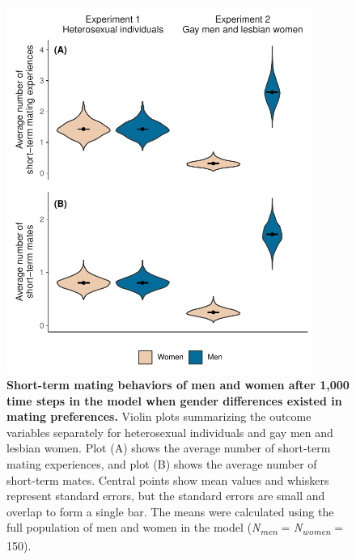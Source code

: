 \documentclass[
  12pt,
]{article}
\begin{document}
\begin{figure}[h]
  \centering
  \includegraphics[width=100mm]{figures/fig1_men_vs_women.pdf}
  \caption{\textbf{Short-term mating behaviors of men and women after 1,000 time steps in the model when gender differences existed in mating preferences.} Violin plots summarizing the outcome variables separately for heterosexual individuals and gay men and lesbian women. Plot (A) shows the average number of short-term mating experiences, and plot (B) shows the average number of short-term mates. Central points show mean values and whiskers represent standard errors, but the standard errors are small and overlap to form a single bar. The means were calculated using the full population of men and women in the model (\textit{N\textsubscript{men}} = \textit{N\textsubscript{women}} = 150).}
  \label{fig:men_vs_women}
\end{figure}
\end{document}
